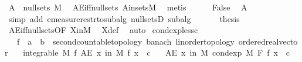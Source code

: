 \begin{isabellebody}
\ {\isachardoublequoteopen}A\ {\isasymin}\ null{\isacharunderscore}{\kern0pt}sets\ M{\isachardoublequoteclose}\ \isamarkupfalse%
\ AE{\isacharunderscore}{\kern0pt}iff{\isacharunderscore}{\kern0pt}null{\isacharunderscore}{\kern0pt}sets\ A{\isacharunderscore}{\kern0pt}in{\isacharunderscore}{\kern0pt}sets{\isacharunderscore}{\kern0pt}M\ \isamarkupfalse%
\ metis\isanewline
\ \ \ \ \isamarkupfalse%
\ False\ \isamarkupfalse%
\ A{\isacharparenleft}{\kern0pt}{}{\isacharparenright}{\kern0pt}\ \isamarkupfalse%
\ {\isacharparenleft}{\kern0pt}simp\ add{\isacharcolon}{\kern0pt}\ emeasure{\isacharunderscore}{\kern0pt}restr{\isacharunderscore}{\kern0pt}to{\isacharunderscore}{\kern0pt}subalg\ null{\isacharunderscore}{\kern0pt}setsD{}\ subalg{\isacharparenright}{\kern0pt}\isanewline
\ \ \isamarkupfalse%
\isanewline
\ \ \isamarkupfalse%
\ {\isacharquery}{\kern0pt}thesis\ \isamarkupfalse%
\ AE{\isacharunderscore}{\kern0pt}iff{\isacharunderscore}{\kern0pt}null{\isacharunderscore}{\kern0pt}sets{\isacharbrackleft}{\kern0pt}OF\ X{\isacharunderscore}{\kern0pt}in{\isacharunderscore}{\kern0pt}M{\isacharbrackright}{\kern0pt}\ \isamarkupfalse%
\ X{\isacharunderscore}{\kern0pt}def\ \isamarkupfalse%
\ auto\isanewline
{}\isamarkupfalse%
%
\endisatagproof
{\isafoldproof}%
%
\isadelimproof
\isanewline
%
\endisadelimproof
\isanewline
{}\isamarkupfalse%
\ cond{\isacharunderscore}{\kern0pt}exp{\isacharunderscore}{\kern0pt}less{\isacharunderscore}{\kern0pt}c{\isacharcolon}{\kern0pt}\isanewline
\ \ \ f\ {\isacharcolon}{\kern0pt}{\isacharcolon}{\kern0pt}\ {\isachardoublequoteopen}{\isacharprime}{\kern0pt}a\ {\isasymRightarrow}\ {\isacharprime}{\kern0pt}b\ {\isacharcolon}{\kern0pt}{\isacharcolon}{\kern0pt}\ {\isacharbraceleft}{\kern0pt}second{\isacharunderscore}{\kern0pt}countable{\isacharunderscore}{\kern0pt}topology{\isacharcomma}{\kern0pt}\ banach{\isacharcomma}{\kern0pt}\ linorder{\isacharunderscore}{\kern0pt}topology{\isacharcomma}{\kern0pt}\ ordered{\isacharunderscore}{\kern0pt}real{\isacharunderscore}{\kern0pt}vector{\isacharbraceright}{\kern0pt}{\isachardoublequoteclose}\isanewline
\ \ \ {\isachardoublequoteopen}integrable\ M\ f{\isachardoublequoteclose}\ {\isachardoublequoteopen}AE\ x\ in\ M{\isachardot}{\kern0pt}\ f\ x\ {\isacharless}{\kern0pt}\ c{\isachardoublequoteclose}\isanewline
\ \ \ {\isachardoublequoteopen}AE\ x\ in\ M{\isachardot}{\kern0pt}\ cond{\isacharunderscore}{\kern0pt}exp\ M\ F\ f\ x\ {\isacharless}{\kern0pt}\ c{\isachardoublequoteclose}\isanewline

\end{isabellebody}

